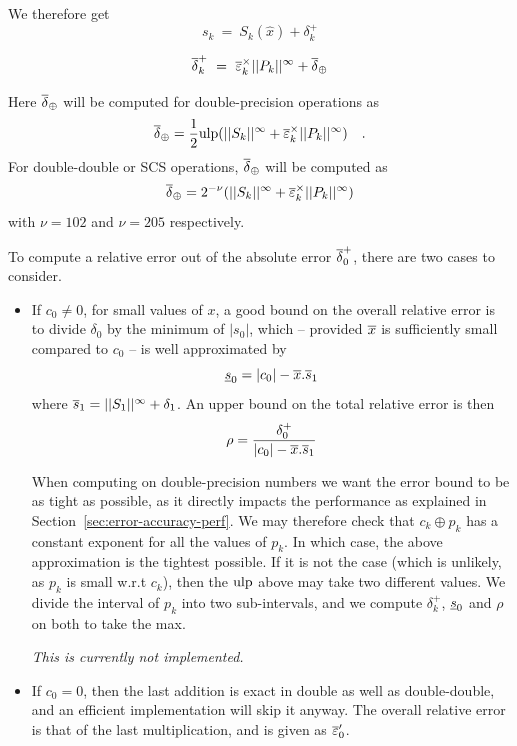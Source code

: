 \begin{itemize}
\begin{itemize}
    We therefore get 
      \begin{equation}
        s_{k} \ = \  S_{k}(\hat{x}) + \delta^+_k \label{eq:sk}
      \end{equation}
      
      \begin{equation}
        {\overline{\delta}}^+_k  \ = \  {\overline{\varepsilon}}^\times_k||{P_{k}}||^{\infty} + {\overline{\delta}}_\oplus\label{eq:maxdelta}
      \end{equation}
      
      Here ${\overline{\delta}}_\oplus$ will be computed for double-precision operations as 
      $${\overline{\delta}}_\oplus = \frac{1}{2}\mbox{ulp}(||{S_{k}}||^{\infty} + {\overline{\varepsilon}}^\times_k||{P_{k}}||^{\infty})\quad .$$
      For double-double or SCS operations, ${\overline{\delta}}_\oplus$ will be computed as
      $${\overline{\delta}}_\oplus=2^{-\nu}(||{S_{k}}||^{\infty} + {\overline{\varepsilon}}^\times_k||{P_{k}}||^{\infty})$$
      with $\nu=102$ and $\nu=205$ respectively.
    \end{itemize}
  \end{itemize}
  

  To compute a  relative error out of the absolute error
  ${\overline{\delta}}^+_0$, there are two cases to consider.
\begin{itemize}
\item If $c_0\ne 0$, for small values of $x$, a good bound on the
  overall relative error is to divide $\delta_0$ by the minimum of
  $|s_0|$, which -- provided ${\overline{x}}$ is sufficiently small compared to
  $c_0$ -- is well approximated by
  $$\underline{s}_{0}=|c_0| - {\overline{x}} . \overline{s}_{1}$$ 
  where $\overline{s}_{1}=||{S_1}||^{\infty} + \delta_1$.
  An upper bound on the total
  relative error is then
  $$\rho = \frac{\delta^+_0}{|c_0| - {\overline{x}} . \overline{s}_{1}}$$
  
  When computing on double-precision numbers we want the error bound
  to be as tight as possible, as it directly impacts the performance
  as explained in Section~\ref{sec:error-accuracy-perf}. We may
  therefore check that $c_k \oplus p_k$ has a constant exponent for
  all the values of $p_k$. In which case, the above approximation is
  the tightest possible. If it is not the case (which is unlikely, as
  $p_k$ is small w.r.t $c_k$), then the $\mbox{ulp}$ above may take two
  different values. We divide the interval of $p_k$ into two
  sub-intervals, and we compute $\delta^+_k$, $\underline{s}_{0}$ and $\rho$ on
  both to take the max.
  
\emph{This is currently not implemented.}

\item If $c_0=0$, then the last addition is exact in double as well as
  double-double, and an efficient implementation will skip it anyway.
  The overall relative error is that of the last multiplication, and is given as ${\overline{\varepsilon}}'_0$.
\end{itemize}

